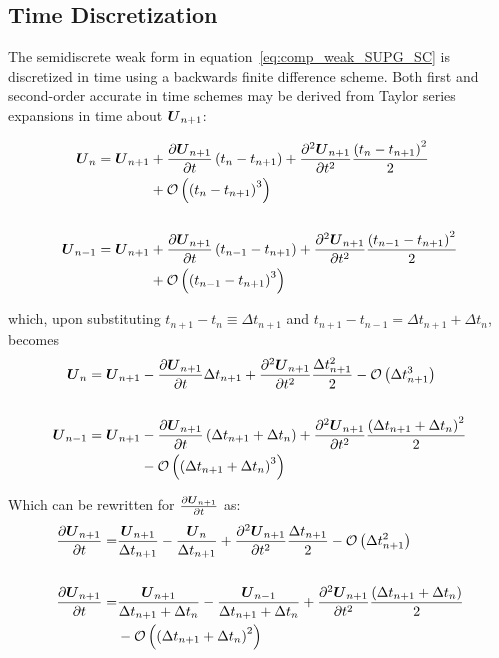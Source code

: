 \documentclass[compress,11pt]{beamer}
\begin{document}
\subsection{Time Discretization}
\frame
{
  \scriptsize
  The semidiscrete weak form in equation~\eqref{eq:comp_weak_SUPG_SC} is discretized in time using a backwards finite difference scheme.  Both first and second-order accurate in time schemes may be derived from Taylor series expansions in time about ${\boldsymbol{U}}_{n+1}$:
  
  {
    \begin{align}
      {\boldsymbol{U}}_n     = {\boldsymbol{U}}_{n+1} &+ {\frac{\partial{{\boldsymbol{U}}_{n+1}}}{\partial{t}}}\left(t_n-t_{n+1}\right) + {\frac{{\partial}^2{{\boldsymbol{U}}_{n+1}}}{\partial{t}^2}}\frac{\left(t_n-t_{n+1}\right)^2}{2} \nonumber \\
      &+ \mathcal{O}\left(\left(t_n-t_{n+1}\right)^3\right) \nonumber \\
      & \nonumber \\
      {\boldsymbol{U}}_{n-1} = {\boldsymbol{U}}_{n+1} &+ {\frac{\partial{{\boldsymbol{U}}_{n+1}}}{\partial{t}}}\left(t_{n-1}-t_{n+1}\right) + {\frac{{\partial}^2{{\boldsymbol{U}}_{n+1}}}{\partial{t}^2}}\frac{\left(t_{n-1}-t_{n+1}\right)^2}{2} \nonumber \\
      &+ \mathcal{O}\left(\left(t_{n-1}-t_{n+1}\right)^3\right) \nonumber
    \end{align}
  }
      
  {
    which, upon substituting $t_{n+1} - t_n\equiv\Delta t_{n+1}$ and $t_{n+1} - t_{n-1}=\Delta t_{n+1} + \Delta t_n$, becomes
    \begin{align}
      {\boldsymbol{U}}_n     = {\boldsymbol{U}}_{n+1} &- {\frac{\partial{{\boldsymbol{U}}_{n+1}}}{\partial{t}}}\Delta t_{n+1} + {\frac{{\partial}^2{{\boldsymbol{U}}_{n+1}}}{\partial{t}^2}}\frac{\Delta t_{n+1}^2}{2} - \mathcal{O}\left(\Delta t_{n+1}^3\right) \nonumber \\ 
      & \nonumber \\
      {\boldsymbol{U}}_{n-1} = {\boldsymbol{U}}_{n+1} &- {\frac{\partial{{\boldsymbol{U}}_{n+1}}}{\partial{t}}}\left(\Delta t_{n+1}+\Delta t_n\right) + {\frac{{\partial}^2{{\boldsymbol{U}}_{n+1}}}{\partial{t}^2}}\frac{\left(\Delta t_{n+1}+\Delta t_n\right)^2}{2} \nonumber \\
      &- \mathcal{O}\left(\left(\Delta t_{n+1}+\Delta t_n\right)^3\right) \nonumber
    \end{align}
  }
}

\frame
{
  \scriptsize
  Which can be rewritten for ${\frac{\partial{{\boldsymbol{U}}_{n+1}}}{\partial{t}}}$ as:
  \begin{align}
    {\frac{\partial{{\boldsymbol{U}}_{n+1}}}{\partial{t}}} = &\frac{{\boldsymbol{U}}_{n+1}}{\Delta t_{n+1}} - \frac{{\boldsymbol{U}}_n}{\Delta t_{n+1}} + {\frac{{\partial}^2{{\boldsymbol{U}}_{n+1}}}{\partial{t}^2}} \frac{\Delta t_{n+1}}{2}
    - \mathcal{O}\left(\Delta t_{n+1}^2\right) \label{eq:udot,un} \\
    & \nonumber \\
    {\frac{\partial{{\boldsymbol{U}}_{n+1}}}{\partial{t}}} = &\frac{{\boldsymbol{U}}_{n+1}}{\Delta t_{n+1} + \Delta t_n} - \frac{{\boldsymbol{U}}_{n-1}}{\Delta t_{n+1} + \Delta t_n} + {\frac{{\partial}^2{{\boldsymbol{U}}_{n+1}}}{\partial{t}^2}}\frac{\left(\Delta t_{n+1} + \Delta t_n\right)}{2} \nonumber \\
    &- \mathcal{O}\left(\left(\Delta t_{n+1} + \Delta t_n\right)^2\right) \label{eq:udot,unm1}
  \end{align}
}
\end{document}
